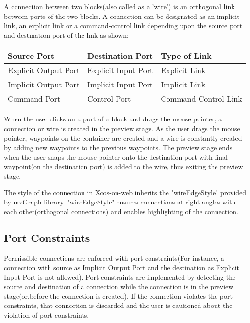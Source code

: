 \documentclass[conference]{IEEEtran}
\begin{document}
A connection between two blocks(also called as a 'wire') is an orthogonal link between ports of the two blocks. A connection can be designated as an implicit link, an explicit link or a command-control link depending upon the source port and destination port of the link as shown:

\begin{center}
\begin{tabu} to 0.48\textwidth { | X[c] | X[c] | X[c] | }
 \hline
 Source Port & Destination Port & Type of Link\\ [0.40ex]

 \hline\hline
 Explicit Output Port & Explicit Input Port & Explicit Link \\ 
 \hline
 Implicit Output Port & Implicit Input Port & Implicit Link \\ 
 \hline
 Command Port & Control Port & Command-Control Link  \\ 
 \hline
\end{tabu}
\end{center}

When the user clicks on a port of a block and drags the mouse pointer, a connection or wire is created in the preview stage. As the user drags the mouse pointer, waypoints on the container are created and a wire is constantly created by adding new waypoints to the previous waypoints.
The preview stage ends when the user snaps the mouse pointer onto the destination port with final waypoint(on the destination port) is added to the wire, thus exiting the preview stage.

The style of the connection in Xcos-on-web inherits the "wireEdgeStyle" provided by mxGraph library. "wireEdgeStyle" ensures connections at right angles with each other(orthogonal connections) and enables highlighting of the connection.

\subsection{Port Constraints}
Permissible connections are enforced with port constraints(For instance, a connection with source as Implicit Output Port and the destination as Explicit Input Port is not allowed). Port constraints are implemented by detecting the source and destination of a connection while the connection is in the preview stage(or,before the connection is created). If the connection violates the port constraints, that connection is discarded and the user is cautioned about the violation of port constraints.
\end{document}

